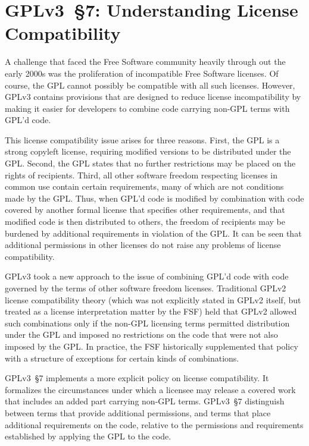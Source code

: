 \section{GPLv3~\S7: Understanding License Compatibility}
\label{license-compatibility}

A challenge that faced the Free Software community heavily through out the
early 2000s was the proliferation of incompatible Free Software licenses.  Of
course, the GPL cannot possibly be compatible with all such licenses.
However, GPLv3
contains provisions that are designed to reduce license incompatibility by
making it easier for developers to combine code carrying non-GPL terms with
GPL'd code.

This license compatibility issue arises for
three reasons.  First, the GPL is a strong copyleft license, requiring
modified versions to be distributed under the GPL\@.  Second, the GPL states
that no further restrictions may be placed on the rights of recipients.
Third, all other software freedom respecting licenses in common use contain certain
requirements, many of which are not conditions made by the GPL\@.  Thus, when
GPL'd code is modified by combination with code covered by another formal
license that specifies other requirements, and that modified code is then
distributed to others, the freedom of recipients may be burdened by
additional requirements in violation of the GPL.  It can be seen that
additional permissions in other licenses do not raise any problems of license
compatibility.

GPLv3  took a new approach to the issue of combining GPL'd code with
code governed by the terms of other software freedom licenses.  Traditional
GPLv2 license compatibility theory (which was not explicitly stated in GPLv2
itself, but treated as a license interpretation matter by the FSF) held that GPLv2 allowed such
combinations only if the non-GPL licensing terms permitted distribution under
the GPL and imposed no restrictions on the code that were not also imposed by
the GPL\@.  In practice, the FSF historically supplemented that policy with a structure of
exceptions for certain kinds of combinations.

GPLv3~\S7  implements a more explicit policy on license
compatibility.  It formalizes the circumstances under which a licensee may
release a covered work that includes an added part carrying non-GPL terms. 
GPLv3~\S7 distinguish between terms that provide additional permissions, and terms that
place additional requirements on the code, relative to the permissions and
requirements established by applying the GPL to the code.

